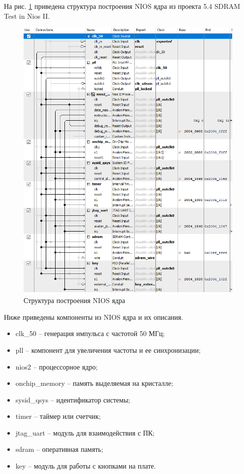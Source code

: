 \documentclass[a4paper,14pt]{article}
\begin{document}
	На рис. \ref{fig:niossh1} приведена структура построения NIOS ядра из проекта 5.4 SDRAM Test in Nios II.
	
	\begin{figure}[H]
		\centering
		\includegraphics[width=0.7\linewidth]{images/nios_sh_1}
		\caption{Структура построения NIOS ядра}
		\label{fig:niossh1}
	\end{figure}
	
	Ниже приведены компоненты из NIOS ядра и их описания.
	
	\begin{itemize}
		
		\item clk\_50 -- генерация импульса с частотой 50 МГц;
		
		\item pll -- компонент для увеличения частоты и ее синхронизации;
		
		\item nios2 -- процессорное ядро;
		
		\item onchip\_memory -- память выделяемая на кристалле;
		
		\item sysid\_qsys -- идентификатор системы;
		
		\item timer -- таймер или счетчик;
		
		\item jtag\_uart -- модуль для взаимодействия с ПК;
		
		\item sdram -- оперативная память;
		
		\item key -- модуль для работы с кнопками на плате.
		
	\end{itemize}
\end{document}
